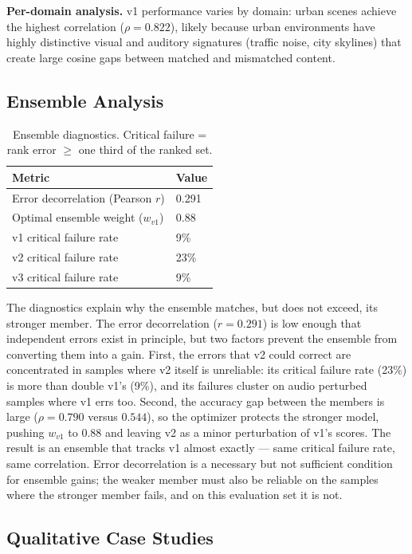 \textbf{Per-domain analysis.} v1 performance varies by domain: urban scenes achieve the highest correlation ($\rho = 0.822$), likely because urban environments have highly distinctive visual and auditory signatures (traffic noise, city skylines) that create large cosine gaps between matched and mismatched content.

\subsection{Ensemble Analysis}\label{sec:ensemble-analysis}

\begin{table}[t]
\caption{Ensemble diagnostics. Critical failure = rank error $\geq$ one third of the ranked set.}\label{tab:ensemble-diag}
\centering
\begin{tabular}{ll}
\toprule
Metric & Value \\
\midrule
Error decorrelation (Pearson $r$) & 0.291 \\
Optimal ensemble weight ($w_{v1}$) & 0.88 \\
v1 critical failure rate & 9\% \\
v2 critical failure rate & 23\% \\
v3 critical failure rate & 9\% \\
\bottomrule
\end{tabular}
\end{table}

The diagnostics explain why the ensemble matches, but does not exceed, its stronger member. The error decorrelation ($r = 0.291$) is low enough that independent errors exist in principle, but two factors prevent the ensemble from converting them into a gain. First, the errors that v2 could correct are concentrated in samples where v2 itself is unreliable: its critical failure rate (23\%) is more than double v1's (9\%), and its failures cluster on audio perturbed samples where v1 errs too. Second, the accuracy gap between the members is large ($\rho = 0.790$ versus $0.544$), so the optimizer protects the stronger model, pushing $w_{v1}$ to 0.88 and leaving v2 as a minor perturbation of v1's scores. The result is an ensemble that tracks v1 almost exactly — same critical failure rate, same correlation. Error decorrelation is a necessary but not sufficient condition for ensemble gains; the weaker member must also be reliable on the samples where the stronger member fails, and on this evaluation set it is not.

\subsection{Qualitative Case Studies}\label{sec:case-studies}

